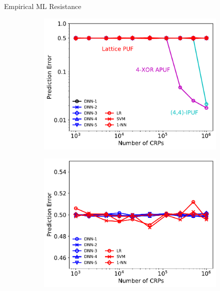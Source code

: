 \begin{frame}{Empirical ML Resistance}
    \begin{figure}
  \begin{subfigure}[b]{0.48\textwidth}
    \includegraphics[width=\textwidth]{fig/DNNAllPUFs.pdf}
    \label{fig:1}
  \end{subfigure}
  \begin{subfigure}[b]{0.48\textwidth}
    \includegraphics[width=\textwidth]{fig/MLAttackLatticePUF.pdf}
    \label{fig:2}
  \end{subfigure}
  

\end{figure}
\end{frame}
